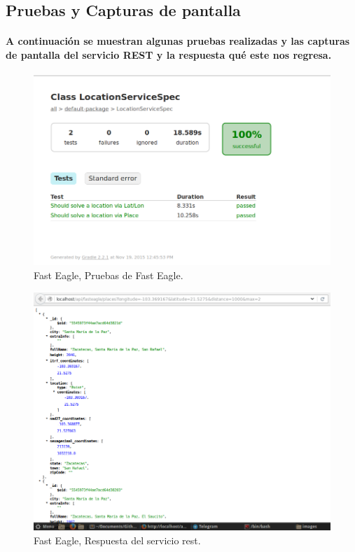   \subsection{Pruebas y Capturas de pantalla}
    \paragraph{A continuación se muestran algunas pruebas realizadas y las capturas de pantalla del servicio REST y la respuesta qué este nos regresa.}
    \begin{figure}[h!]
      \centering
        \includegraphics[width=\textwidth]{./images/PruebasFastEagle}
        \caption{Fast Eagle, Pruebas de Fast Eagle.}
    \end{figure}
    \begin{figure}[h!]
      \centering
        \includegraphics[width=\textwidth]{./images/CapturaFastEagle}
        \caption{Fast Eagle, Respuesta del servicio rest.}
    \end{figure}
